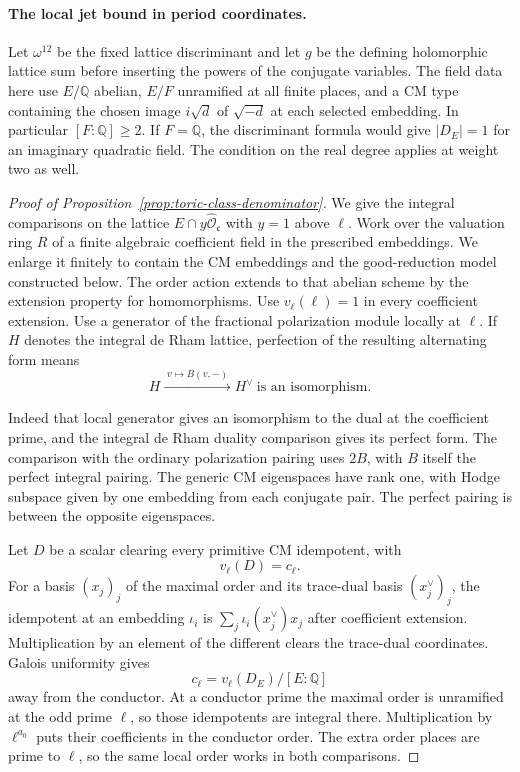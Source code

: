 \paragraph{The local jet bound in period coordinates.}
Let \(\omega^{12}\) be the fixed lattice discriminant
and let \(g\) be the defining holomorphic lattice sum
before inserting the powers of the conjugate variables.
The field data here use \(E/\mathbb Q\) abelian,
\(E/F\) unramified at all finite places, and a CM type
containing the chosen image \(i\sqrt d\) of \(\sqrt{-d}\)
at each selected embedding. In particular
\([F:\mathbb Q]\ge2\). If \(F=\mathbb Q\), the
discriminant formula would give \(|D_E|=1\) for an
imaginary quadratic field. The condition on the real
degree applies at weight two as well.

\begin{proof}[Proof of Proposition~\ref{prop:toric-class-denominator}]
We give the integral comparisons on the lattice
\(E\cap y\widehat{\mathcal O}_{\mathfrak c}\) with
\(y=1\) above \(\ell\). Work over the valuation ring
\(R\) of a finite algebraic coefficient field in
the prescribed embeddings. We enlarge it finitely
to contain the CM embeddings and the good-reduction
model constructed below. The order action extends
to that abelian scheme by the extension property
for homomorphisms. Use \(v_\ell(\ell)=1\) in every
coefficient extension.
Use a generator of the fractional polarization
module locally at \(\ell\). If \(H\) denotes the integral de Rham lattice, perfection of the resulting alternating form means
\[
 H\xrightarrow{\;v\mapsto B(v,-)\;}H^\vee\ \text{is an isomorphism}.
\]

Indeed that local generator gives an isomorphism to
the dual at the coefficient prime, and the integral
de Rham duality comparison gives its perfect form.
The comparison with the ordinary polarization
pairing uses \(2B\), with \(B\) itself the perfect
integral pairing. The generic CM eigenspaces have
rank one, with Hodge subspace given by one
embedding from each conjugate pair. The perfect
pairing is between the opposite eigenspaces.

Let \(D\) be a scalar clearing every primitive CM
idempotent, with
\[
 v_\ell(D)=c_\ell.
\]
For a basis
\((x_j)_j\) of the maximal order and its trace-dual basis
\((x_j^\vee)_j\), the idempotent at an embedding \(\iota_i\)
is \(\sum_j\iota_i(x_j^\vee)x_j\) after coefficient
extension. Multiplication by an element of the different
clears the trace-dual coordinates. Galois uniformity gives
\[
 c_\ell=v_\ell(D_E)/[E:\mathbb Q]
\]
away from the conductor.
At a conductor prime the maximal order is unramified at the
odd prime \(\ell\), so those idempotents are integral there.
Multiplication by \(\ell^{a_0}\) puts their coefficients in
the conductor order. The extra order places are prime to
\(\ell\), so the same local order works in both comparisons.


\end{proof}
